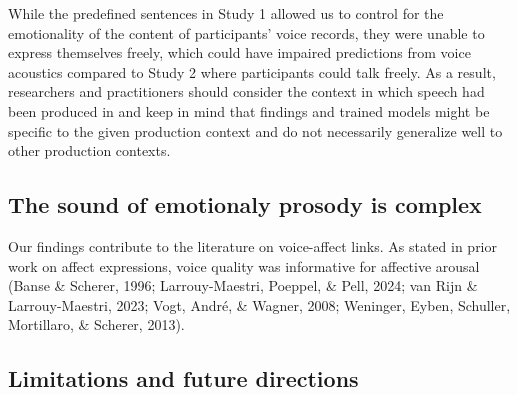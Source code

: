 \documentclass[
  english,
  man,floatsintext]{apa6}
\begin{document}
While the predefined sentences in Study 1 allowed us to control for the emotionality of the content of participants' voice records, they were unable to express themselves freely, which could have impaired predictions from voice acoustics compared to Study 2 where participants could talk freely. As a result, researchers and practitioners should consider the context in which speech had been produced in and keep in mind that findings and trained models might be specific to the given production context and do not necessarily generalize well to other production contexts.

\hypertarget{the-sound-of-emotionaly-prosody-is-complex}{%
\subsection{The sound of emotionaly prosody is complex}\label{the-sound-of-emotionaly-prosody-is-complex}}

Our findings contribute to the literature on voice-affect links. As stated in prior work on affect expressions, voice quality was informative for affective arousal
(Banse \& Scherer, 1996; Larrouy-Maestri, Poeppel, \& Pell, 2024; van Rijn \& Larrouy-Maestri, 2023; Vogt, André, \& Wagner, 2008; Weninger, Eyben, Schuller, Mortillaro, \& Scherer, 2013).

\hypertarget{limitations-and-future-directions}{%
\subsection{Limitations and future directions}\label{limitations-and-future-directions}}
\end{document}
